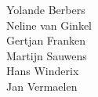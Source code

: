 \flushright{}
Yolande Berbers\\
Neline van Ginkel\\
Gertjan Franken\\
Martijn Sauwens\\
Hans Winderix\\
Jan Vermaelen\\